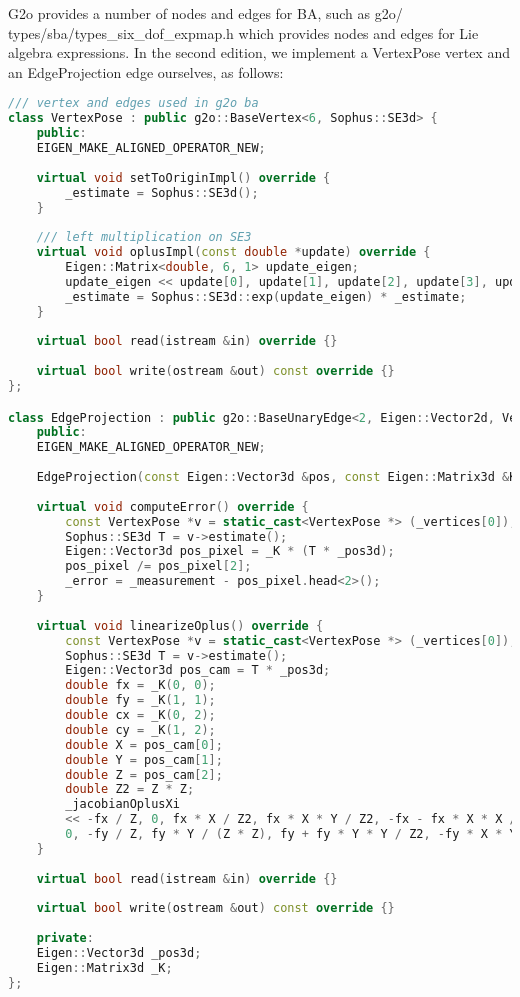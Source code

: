 G2o provides a number of nodes and edges for BA, such as g2o/\\types/sba/types\_six\_dof\_expmap.h which provides nodes and edges for Lie algebra expressions. In the second edition, we implement a VertexPose vertex and an EdgeProjection edge ourselves, as follows:
\begin{lstlisting}[language=c++,caption=slambook2/ch7/pose_estimation_3d2d.cpp（片段）]
/// vertex and edges used in g2o ba
class VertexPose : public g2o::BaseVertex<6, Sophus::SE3d> {
	public:
	EIGEN_MAKE_ALIGNED_OPERATOR_NEW;
	
	virtual void setToOriginImpl() override {
		_estimate = Sophus::SE3d();
	}
	
	/// left multiplication on SE3
	virtual void oplusImpl(const double *update) override {
		Eigen::Matrix<double, 6, 1> update_eigen;
		update_eigen << update[0], update[1], update[2], update[3], update[4], update[5];
		_estimate = Sophus::SE3d::exp(update_eigen) * _estimate;
	}
	
	virtual bool read(istream &in) override {}
	
	virtual bool write(ostream &out) const override {}
};

class EdgeProjection : public g2o::BaseUnaryEdge<2, Eigen::Vector2d, VertexPose> {
	public:
	EIGEN_MAKE_ALIGNED_OPERATOR_NEW;
	
	EdgeProjection(const Eigen::Vector3d &pos, const Eigen::Matrix3d &K) : _pos3d(pos), _K(K) {}
	
	virtual void computeError() override {
		const VertexPose *v = static_cast<VertexPose *> (_vertices[0]);
		Sophus::SE3d T = v->estimate();
		Eigen::Vector3d pos_pixel = _K * (T * _pos3d);
		pos_pixel /= pos_pixel[2];
		_error = _measurement - pos_pixel.head<2>();
	}
	
	virtual void linearizeOplus() override {
		const VertexPose *v = static_cast<VertexPose *> (_vertices[0]);
		Sophus::SE3d T = v->estimate();
		Eigen::Vector3d pos_cam = T * _pos3d;
		double fx = _K(0, 0);
		double fy = _K(1, 1);
		double cx = _K(0, 2);
		double cy = _K(1, 2);
		double X = pos_cam[0];
		double Y = pos_cam[1];
		double Z = pos_cam[2];
		double Z2 = Z * Z;
		_jacobianOplusXi
		<< -fx / Z, 0, fx * X / Z2, fx * X * Y / Z2, -fx - fx * X * X / Z2, fx * Y / Z,
		0, -fy / Z, fy * Y / (Z * Z), fy + fy * Y * Y / Z2, -fy * X * Y / Z2, -fy * X / Z;
	}
	
	virtual bool read(istream &in) override {}
	
	virtual bool write(ostream &out) const override {}
	
	private:
	Eigen::Vector3d _pos3d;
	Eigen::Matrix3d _K;
};
\end{lstlisting}

